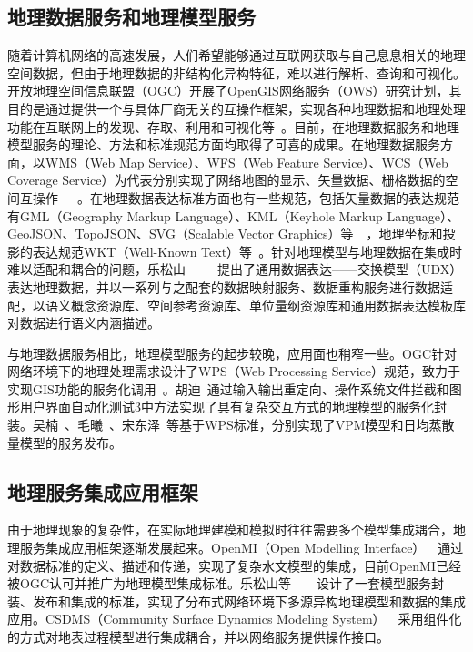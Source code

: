 \subsection{地理数据服务和地理模型服务}
随着计算机网络的高速发展，人们希望能够通过互联网获取与自己息息相关的地理空间数据，但由于地理数据的非结构化异构特征，难以进行解析、查询和可视化。开放地理空间信息联盟（OGC）开展了OpenGIS网络服务（OWS）研究计划，其目的是通过提供一个与具体厂商无关的互操作框架，实现各种地理数据和地理处理功能在互联网上的发现、存取、利用和可视化等~\cite{lake2009infrastructure}。目前，在地理数据服务和地理模型服务的理论、方法和标准规范方面均取得了可喜的成果。在地理数据服务方面，以WMS（Web Map Service）、WFS（Web Feature Service）、WCS（Web Coverage Service）为代表分别实现了网络地图的显示、矢量数据、栅格数据的空间互操作~\cite{OGC-WMS}~\cite{OGC-WCS}~\cite{OGC-WFS}。在地理数据表达标准方面也有一些规范，包括矢量数据的表达规范有GML（Geography Markup Language）、KML（Keyhole Markup Language）、GeoJSON、TopoJSON、SVG（Scalable Vector Graphics）等~\cite{GML}~\cite{KML}，地理坐标和投影的表达规范WKT（Well-Known Text）等~\cite{lott2015geographic}。针对地理模型与地理数据在集成时难以适配和耦合的问题，乐松山~\cite{Yue2015A}~\cite{Yue2013Key}~\cite{yue2015data}~\cite{wang2018study}~\cite{乐松山2016面向地理模型共享与集成的数据适配方法研究}提出了通用数据表达——交换模型（UDX）表达地理数据，并以一系列与之配套的数据映射服务、数据重构服务进行数据适配，以语义概念资源库、空间参考资源库、单位量纲资源库和通用数据表达模板库对数据进行语义内涵描述。

与地理数据服务相比，地理模型服务的起步较晚，应用面也稍窄一些。OGC针对网络环境下的地理处理需求设计了WPS（Web Processing Service）规范，致力于实现GIS功能的服务化调用~\cite{OGC-WPS}。胡迪~\cite{胡迪2015地理模型的服务化封装方法研究}通过输入输出重定向、操作系统文件拦截和图形用户界面自动化测试3中方法实现了具有复杂交互方式的地理模型的服务化封装。吴楠~\cite{吴楠2012基于}、毛曦~\cite{毛曦2012基于}、宋东泽~\cite{宋东泽2015一个生态传感网的}等基于WPS标准，分别实现了VPM模型和日均蒸散量模型的服务发布。

\subsection{地理服务集成应用框架}
由于地理现象的复杂性，在实际地理建模和模拟时往往需要多个模型集成耦合，地理服务集成应用框架逐渐发展起来。OpenMI（Open Modelling Interface）~\cite{MOORE2005279}~\cite{gregersen2007openmi}通过对数据标准的定义、描述和传递，实现了复杂水文模型的集成，目前OpenMI已经被OGC认可并推广为地理模型集成标准。乐松山等~\cite{yue2016service}~\cite{zhang2019design}~\cite{wen2017model}~\cite{yue2018loosely}设计了一套模型服务封装、发布和集成的标准，实现了分布式网络环境下多源异构地理模型和数据的集成应用。CSDMS（Community Surface Dynamics Modeling System）~\cite{Peckham2013A}~\cite{peckham2009componentizing}采用组件化的方式对地表过程模型进行集成耦合，并以网络服务提供操作接口。


